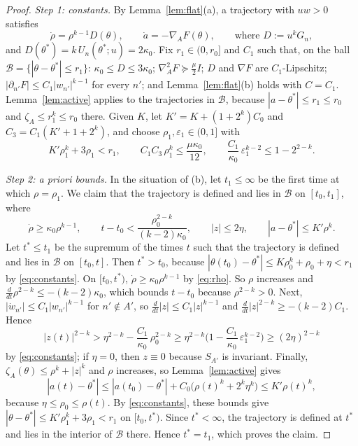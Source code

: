 \documentclass[11pt]{article}
\theoremstyle{definition}
\theoremstyle{remark}
\newcommand{\cB}{\mathcal{B}}
\newcommand{\eps}{\varepsilon}
\begin{document}
\begin{proof}
\emph{Step 1: constants.} By Lemma~\ref{lem:flat}(a), a trajectory with $uw>0$ satisfies
\begin{equation}\label{eq:rho}
\dot\rho=\rho^{k-1}D(\theta),\qquad\dot a=-\nabla_AF(\theta),\qquad\text{where }D:=u^kG_n,
\end{equation}
and $D(\theta^*)=k\,U_n(\theta^*;u)=2\kappa_0$. Fix $r_1\in(0,r_0]$ and $C_1$ such that, on the ball $\cB=\{|\theta-\theta^*|\le r_1\}$: $\kappa_0\le D\le3\kappa_0$; $\nabla_A^2F\succeq\frac\mu2I$; $D$ and $\nabla F$ are $C_1$-Lipschitz; $|\partial_{n'}F|\le C_1|w_{n'}|^{k-1}$ for every $n'$; and Lemma~\ref{lem:flat}(b) holds with $C=C_1$. Lemma~\ref{lem:active} applies to the trajectories in $\cB$, because $|a-\theta^*|\le r_1\le r_0$ and $\zeta_A\le r_1^k\le r_0$ there. Given $K$, let $K'=K+(1+2^k)C_0$ and $C_3=C_1(K'+1+2^k)$, and choose $\rho_1,\eps_1\in(0,1]$ with
\begin{equation}\label{eq:constants}
K'\rho_1^k+3\rho_1<r_1,\qquad C_1C_3\,\rho_1^k\le\frac{\mu\kappa_0}{12},\qquad\frac{C_1}{\kappa_0}\,\eps_1^{k-2}\le1-2^{2-k}.
\end{equation}

\emph{Step 2: a priori bounds.} In the situation of (b), let $t_1\le\infty$ be the first time at which $\rho=\rho_1$. We claim that the trajectory is defined and lies in $\cB$ on $[t_0,t_1]$, where
\begin{equation}\label{eq:apriori}
\dot\rho\ge\kappa_0\rho^{k-1},\qquad t-t_0<\frac{\rho_0^{2-k}}{(k-2)\kappa_0},\qquad|z|\le2\eta,\qquad|a-\theta^*|\le K'\rho^k .
\end{equation}
Let $t^*\le t_1$ be the supremum of the times $t$ such that the trajectory is defined and lies in $\cB$ on $[t_0,t]$. Then $t^*>t_0$, because $|\theta(t_0)-\theta^*|\le K\rho_0^k+\rho_0+\eta<r_1$ by \eqref{eq:constants}. On $[t_0,t^*)$, $\dot\rho\ge\kappa_0\rho^{k-1}$ by \eqref{eq:rho}. So $\rho$ increases and $\frac{d}{dt}\rho^{2-k}\le-(k-2)\kappa_0$, which bounds $t-t_0$ because $\rho^{2-k}>0$. Next, $|\dot w_{n'}|\le C_1|w_{n'}|^{k-1}$ for $n'\notin A'$, so $\frac{d}{dt}|z|\le C_1|z|^{k-1}$ and $\frac{d}{dt}|z|^{2-k}\ge-(k-2)C_1$. Hence
\[
|z(t)|^{2-k}>\eta^{2-k}-\frac{C_1}{\kappa_0}\,\rho_0^{2-k}\ge\eta^{2-k}\Big(1-\frac{C_1}{\kappa_0}\,\eps_1^{k-2}\Big)\ge(2\eta)^{2-k}
\]
by \eqref{eq:constants}; if $\eta=0$, then $z\equiv0$ because $S_{A'}$ is invariant. Finally, $\zeta_A(\theta)\le\rho^k+|z|^k$ and $\rho$ increases, so Lemma~\ref{lem:active} gives
\[
|a(t)-\theta^*|\le|a(t_0)-\theta^*|+C_0\big(\rho(t)^k+2^k\eta^k\big)\le K'\rho(t)^k,
\]
because $\eta\le\rho_0\le\rho(t)$. By \eqref{eq:constants}, these bounds give $|\theta-\theta^*|\le K'\rho_1^k+3\rho_1<r_1$ on $[t_0,t^*)$. Since $t^*<\infty$, the trajectory is defined at $t^*$ and lies in the interior of $\cB$ there. Hence $t^*=t_1$, which proves the claim.


\end{proof}
\end{document}
